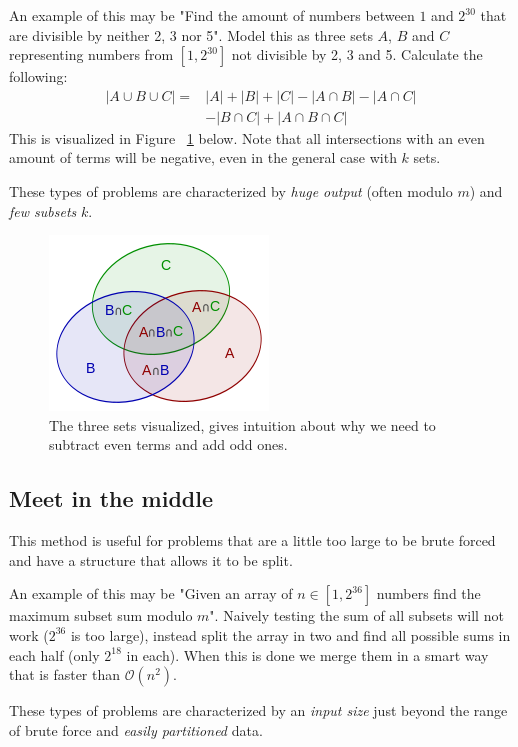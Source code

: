 \documentclass[8pt,a4paper,landscape,oneside]{amsart}
\newcommand{\bigO}{\mathcal{O}}
\begin{document}
\begin{multicols*}{3}
  An example of this may be "Find the amount of numbers between $1$ and $2^{30}$ that are divisible by neither 2, 3 nor 5". Model this as three sets $A$, $B$ and $C$ representing numbers from $[1, 2^{30}]$ not divisible by 2, 3 and 5. Calculate the following:
  \[
  \begin{split}
  |A \cup B \cup C| = & |A| + |B| + |C| - |A \cap B| - |A \cap C| \\
  & - |B \cap C| + |A \cap B \cap C|
  \end{split}
  \]
  This is visualized in Figure ~\ref{inclusion-exclusion} below. Note that all intersections with an even amount of terms will be negative, even in the general case with $k$ sets.
  
  These types of problems are characterized by \emph{huge output} (often modulo $m$) and \emph{few subsets} $k$.
  
  \begin{figure}[H]
  \centering
   \includegraphics[scale=0.5]{inclusion-exclusion_principle.png}
   \caption{The three sets visualized, gives intuition about why we need to subtract even terms and add odd ones.}
   \label{inclusion-exclusion}
  \end{figure}
  
  \subsection{Meet in the middle}
  This method is useful for problems that are a little too large to be brute forced and have a structure that allows it to be split. 
  
  An example of this may be "Given an array of $n \in [1, 2^{36}]$ numbers find the maximum subset sum modulo $m$". Naively testing the sum of all subsets will not work ($2^{36}$ is too large), instead split the array in two and find all possible sums in each half (only $2^{18}$ in each). When this is done we merge them in a smart way that is faster than $\bigO(n^2)$.
  
  These types of problems are characterized by an \emph{input size} just beyond the range of brute force and \emph{easily partitioned} data.



\end{multicols*}
\end{document}
